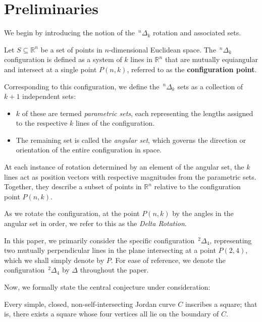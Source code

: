 \section{Preliminaries}

We begin by introducing the notion of the $\,^n \Delta_k$ rotation and associated sets.

Let $S \subseteq \mathbb{R}^n$ be a set of points in $n$-dimensional Euclidean space. The $\,^n \Delta_k$ configuration is defined as a system of $k$ lines in $\mathbb{R}^n$ that are mutually equiangular and intersect at a single point $P(n, k)$, referred to as the \textbf{configuration point}.

Corresponding to this configuration, we define the $\,^n \Delta_k$ sets as a collection of $k+1$ independent sets:  
\begin{itemize}
    \item $k$ of these are termed \textit{parametric sets}, each representing the lengths assigned to the respective $k$ lines of the configuration.  
    \item The remaining set is called the \textit{angular set}, which governs the direction or orientation of the entire configuration in space.
\end{itemize}

At each instance of rotation determined by an element of the angular set, the $k$ lines act as position vectors with respective magnitudes from the parametric sets. Together, they describe a subset of points in $\mathbb{R}^n$ relative to the configuration point $P(n, k)$.

As we rotate the configuration, at the point $P(n, k)$ by the angles in the angular set in order, we refer to this as the \emph{Delta Rotation}.

In this paper, we primarily consider the specific configuration $\,^2 \Delta_4$, representing two mutually perpendicular lines in the plane intersecting at a point $P(2, 4)$, which we shall simply denote by $P$. For ease of reference, we denote the configuration $\,^2 \Delta_4$ by $\Delta$ throughout the paper.

Now, we formally state the central conjecture under consideration:

\begin{conjecture}
Every simple, closed, non-self-intersecting Jordan curve $C$ inscribes a square; that is, there exists a square whose four vertices all lie on the boundary of $C$.
\end{conjecture}

